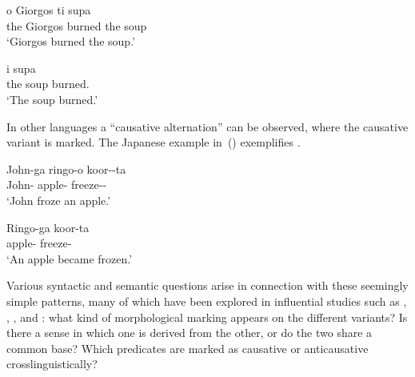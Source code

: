 \begin{exe}
\begin{xlist}
\begin{exe}
\begin{exe}
\begin{exe}
\begin{exe}
\begin{xlist}
\begin{exe}
\begin{xlist}
\begin{xlist}
 \z

 \ex \label{ex:intro3} 
 \begin{xlist} 
 	\ex   
 		\gll o Giorgos  ti supa\\
		 the Giorgos burned the soup\\ 
 		\glt `Giorgos burned the soup.' 
	
 	\ex   
 		\gll i supa \\
		 the soup burned.\\ 
 		\glt `The soup burned.' 
	
 \z
\z 

In other languages a ``causative alternation'' can be observed, where the causative variant is marked. The Japanese example in~(\nextx) exemplifies \citep[3]{oseki17nyu}.
 \begin{exe}
 \ex  
 \begin{xlist} 
 	\ex   
 		\gll John-ga ringo-o koor--ta\\
		 John- apple- freeze--\\ 
 		\glt `John froze an apple.' 
	
 	\ex   
 		\gll Ringo-ga koor-ta\\
		 apple- freeze-\\ 
 		\glt `An apple became frozen.' 
	
 \z
\z 

Various syntactic and semantic questions arise in connection with these seemingly simple patterns, many of which have been explored in influential studies such as \cite{haspelmath93}, \cite{unaccusativity95}, \cite{schaefer08}, \cite{koontzgarboden09} and \cite{layering15}: what kind of morphological marking appears on the different variants? Is there a sense in which one is derived from the other, or do the two share a common base? Which predicates are marked as causative or anticausative crosslinguistically? 


\end{xlist}
\end{exe}
\end{xlist}
\end{xlist}
\end{xlist}
\end{exe}
\end{xlist}
\end{exe}
\end{exe}
\end{exe}
\end{exe}
\end{xlist}
\end{exe}
